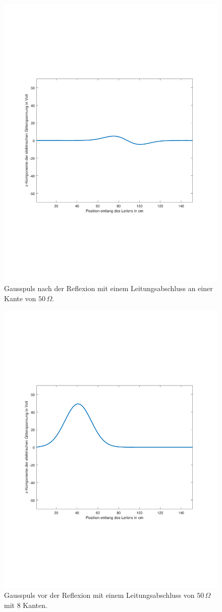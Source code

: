 \documentclass[Protokollheft.tex]{subfiles}
\begin{document}
\begin{figure}[ht]
	\centering
	\includegraphics[trim = 20mm 65mm 20mm 65mm, clip,width=0.7\linewidth]{untitled4.pdf}
	\caption{Gausspuls nach der Reflexion mit einem Leitungsabschluss an einer Kante von $50\,\Omega$.}\label{fig:gauss4}
\end{figure}
\begin{figure}[ht]
	\centering
	\includegraphics[trim = 20mm 65mm 20mm 65mm, clip,width=0.7\linewidth]{untitled5.pdf}
	\caption{Gausspuls vor der Reflexion mit einem Leitungsabschluss von $50\,\Omega$ mit 8 Kanten.}\label{fig:gauss5}
\end{figure}
\end{document}

